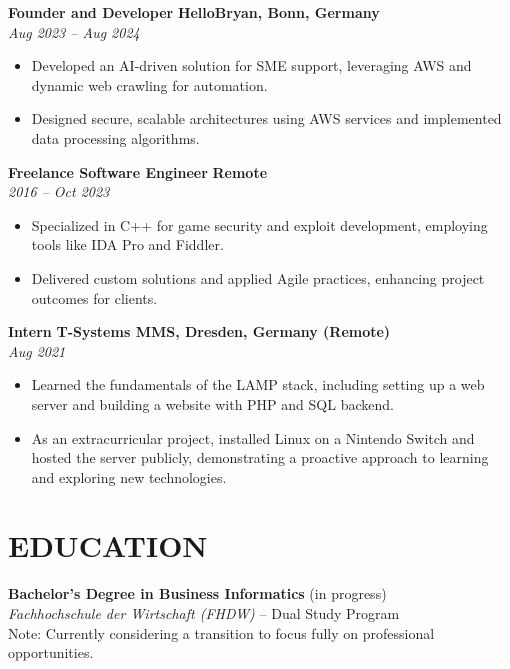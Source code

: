 \documentclass[a4paper,10pt]{article}
\begin{document}
\vspace{2pt}
\textbf{Founder and Developer} \hfill \textbf{HelloBryan, Bonn, Germany} \\
\textit{Aug 2023 – Aug 2024}
\begin{itemize}[leftmargin=*,itemsep=0.3pt,topsep=2pt]
    \item Developed an AI-driven solution for SME support, leveraging AWS and dynamic web crawling for automation.
    \item Designed secure, scalable architectures using AWS services and implemented data processing algorithms.
\end{itemize}
\vspace{2pt}
\textbf{Freelance Software Engineer} \hfill \textbf{Remote} \\
\textit{2016 – Oct 2023}
\begin{itemize}[leftmargin=*,itemsep=0.3pt,topsep=2pt]
    \item Specialized in C++ for game security and exploit development, employing tools like IDA Pro and Fiddler.
    \item Delivered custom solutions and applied Agile practices, enhancing project outcomes for clients.
\end{itemize}
\vspace{2pt}
\textbf{Intern} \hfill \textbf{T-Systems MMS, Dresden, Germany (Remote)} \\
\textit{Aug 2021}
\begin{itemize}[leftmargin=*,itemsep=0.3pt,topsep=2pt]
    \item Learned the fundamentals of the LAMP stack, including setting up a web server and building a website with PHP and SQL backend.
    \item As an extracurricular project, installed Linux on a Nintendo Switch and hosted the server publicly, demonstrating a proactive approach to learning and exploring new technologies.
\end{itemize}
\vspace{5pt}
\section*{\normalsize EDUCATION}
\textbf{Bachelor’s Degree in Business Informatics} (in progress) \\
\textit{Fachhochschule der Wirtschaft (FHDW)} – Dual Study Program \\
Note: Currently considering a transition to focus fully on professional opportunities.
\end{document}
